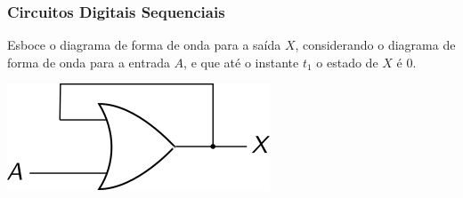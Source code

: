 \documentclass{beamer}
\begin{document}
\begin{frame}
\frametitle{Circuitos Digitais Sequenciais}

Esboce o diagrama de forma de onda para a saída $X$, considerando
o diagrama de forma de onda para a entrada $A$, e que até o instante
$t_1$ o estado de $X$ é $0$.

\begin{center}
	\includegraphics{images/circuit1}
\end{center}

\vspace{-24pt}


\end{frame}
\end{document}
